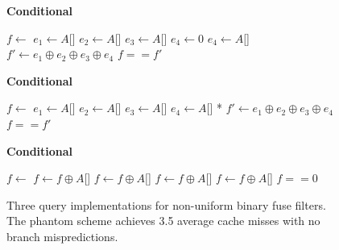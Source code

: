 \begin{figure}[H]
    \centering
    \begin{minipage}[t]{0.32\textwidth}
        \centering\textbf{Conditional}
        \tiny
        \begin{algorithmic}
                \State $f \gets$ 
                \State $e_1 \gets A[$]
                \State $e_2 \gets A[$]
                \State $e_3 \gets A[$]
                \State $e_4 \gets 0$
                    \State $e_4 \gets A[$]
                \EndIf
                \State $f' \gets e_1 \oplus e_2 \oplus e_3 \oplus e_4$
                \State \Return $f == f'$ 
            \EndFunction
        \end{algorithmic}
    \end{minipage}
    \hfill
    \begin{minipage}[t]{0.32\textwidth}
        \centering\textbf{Conditional}
        \tiny
        \begin{algorithmic}
                \State $f \gets$ 
                \State $e_1 \gets A[$]
                \State $e_2 \gets A[$]
                \State $e_3 \gets A[$]
                \State $e_4 \gets A[$] * 
                \State $f' \gets e_1 \oplus e_2 \oplus e_3 \oplus e_4$
                \State \Return $f == f'$ 
            \EndFunction
        \end{algorithmic}
    \end{minipage}
    \hfill
    \begin{minipage}[t]{0.32\textwidth}
        \centering\textbf{Conditional}
        \tiny
        \begin{algorithmic}
                \State $f \gets$ 
                \State $f \gets f \oplus A[$]
                \State $f \gets f \oplus A[$]
                \State $f \gets f \oplus A[$]
                    \State $f \gets f \oplus A[$]
                \EndIf
                \State \Return $f == 0$ 
            \EndFunction
        \end{algorithmic}
    \end{minipage}
    \caption{Three query implementations for non-uniform binary fuse filters. The phantom scheme achieves 3.5 average cache misses with no branch mispredictions.}
    \label{fig:schemes}
\end{figure}

